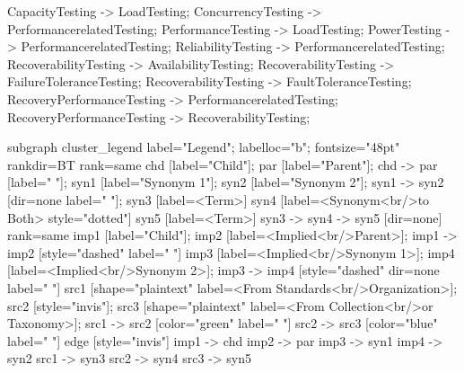 \documentclass{article}
\begin{document}
{CapacityTesting -> LoadTesting;
ConcurrencyTesting -> PerformancerelatedTesting;
PerformanceTesting -> LoadTesting;
PowerTesting -> PerformancerelatedTesting;
ReliabilityTesting -> PerformancerelatedTesting;
RecoverabilityTesting -> AvailabilityTesting;
RecoverabilityTesting -> FailureToleranceTesting;
RecoverabilityTesting -> FaultToleranceTesting;
RecoveryPerformanceTesting -> PerformancerelatedTesting;
RecoveryPerformanceTesting -> RecoverabilityTesting;

subgraph cluster_legend {
label="Legend";
labelloc="b";
fontsize="48pt"
rankdir=BT
{
rank=same
chd [label="Child"];
par [label="Parent"];
chd -> par [label="                "];
syn1 [label="Synonym 1"];
syn2 [label="Synonym 2"];
syn1 -> syn2 [dir=none label="                "];
syn3 [label=<Term>]
syn4 [label=<Synonym<br/>to Both> style="dotted"]
syn5 [label=<Term>]
syn3 -> syn4 -> syn5 [dir=none]
}
{
rank=same
imp1 [label="Child"];
imp2 [label=<Implied<br/>Parent>];
imp1 -> imp2 [style="dashed" label="                "]
imp3 [label=<Implied<br/>Synonym 1>];
imp4 [label=<Implied<br/>Synonym 2>];
imp3 -> imp4 [style="dashed" dir=none label="                "]
src1 [shape="plaintext" label=<From Standards<br/>Organization>];
src2 [style="invis"];
src3 [shape="plaintext" label=<From Collection<br/>or Taxonomy>];
src1 -> src2 [color="green" label="                "]
src2 -> src3 [color="blue"  label="                "]
}
edge [style="invis"]
imp1 -> chd
imp2 -> par
imp3 -> syn1
imp4 -> syn2
src1 -> syn3
src2 -> syn4
src3 -> syn5
}

}
\end{document}
